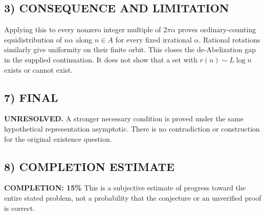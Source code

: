 \subsection*{3) CONSEQUENCE AND LIMITATION}
Applying this to every nonzero integer multiple of $2\pi\alpha$ proves ordinary-counting equidistribution of $n\alpha$ along $n\in A$ for every fixed irrational $\alpha$. Rational rotations similarly give uniformity on their finite orbit. This closes the de-Abelization gap in the supplied continuation. It does not show that a set with $r(n)\sim L\log n$ exists or cannot exist.
\subsection*{7) FINAL}
\textbf{UNRESOLVED.} A stronger necessary condition is proved under the same hypothetical representation asymptotic. There is no contradiction or construction for the original existence question.

\subsection*{8) COMPLETION ESTIMATE}
\textbf{COMPLETION: 15\%}
This is a subjective estimate of progress toward the entire stated problem, not a probability that the conjecture or an unverified proof is correct.
